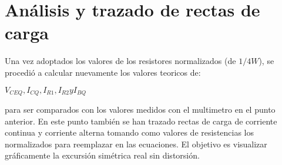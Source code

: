 \saltoPag
\section{Análisis y trazado de rectas de carga}
\begin{multicols}{2}
        \sangria{} Una vez adoptados los valores de los resistores normalizados (de $1/4 W$), se procedió a calcular nuevamente los valores teoricos de:
        \begin{center}
            $V_{CEQ}, I_{CQ}, I_{R1}, I_{R2} y I_{BQ}$
        \end{center}
        para ser comparados con los valores medidos con el multimetro en el punto anterior.
        \sangria{} En este punto también se han trazado rectas de carga de corriente continua y corriente alterna tomando como valores de resistencias los normalizados para reemplazar en las ecuaciones. El objetivo es visualizar gráficamente la excursión simétrica real sin distorsión.
\end{multicols}
